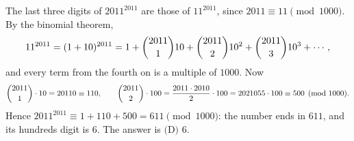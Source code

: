 The last three digits of $2011^{2011}$ are those of $11^{2011}$, since $2011\equiv11\pmod{1000}$. By the binomial theorem,
\[11^{2011}=(1+10)^{2011}=1+\dbinom{2011}{1}10+\dbinom{2011}{2}10^2+\dbinom{2011}{3}10^3+\cdots,\]
and every term from the fourth on is a multiple of $1000$. Now
\[\dbinom{2011}{1}\cdot10=20110\equiv110,\qquad\dbinom{2011}{2}\cdot100=\dfrac{2011\cdot2010}{2}\cdot100=2021055\cdot100\equiv500\pmod{1000}.\]
Hence $2011^{2011}\equiv1+110+500=611\pmod{1000}$: the number ends in $611$, and its hundreds digit is $6$. The answer is $\boxed{\text{(D) }6}$.
